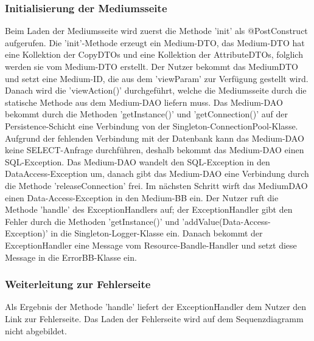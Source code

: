 \documentclass{article}
\begin{document}
\subsubsection{Initialisierung der Mediumsseite}
Beim Laden der Mediumsseite wird zuerst die Methode 'init' als @PostConstruct aufgerufen. Die 'init'-Methode erzeugt ein Medium-DTO, das Medium-DTO hat eine Kollektion der CopyDTOs und eine Kollektion der AttributeDTOs, folglich werden sie vom Medium-DTO erstellt. Der Nutzer bekommt das MediumDTO und setzt eine Medium-ID, die aus dem 'viewParam' zur Verfügung gestellt wird. Danach wird die 'viewAction()' durchgeführt, welche die Mediumsseite durch die statische Methode aus dem Medium-DAO liefern muss. Das Medium-DAO bekommt durch die Methoden 'getInstance()' und 'getConnection()' auf der Persistence-Schicht eine Verbindung von der Singleton-ConnectionPool-Klasse. Aufgrund der fehlenden Verbindung mit der Datenbank kann das Medium-DAO keine SELECT-Anfrage durchführen, deshalb bekommt das Medium-DAO einen SQL-Exception. Das Medium-DAO wandelt den SQL-Exception in den DataAccess-Exception um, danach gibt das Medium-DAO eine Verbindung durch die Methode 'releaseConnection' frei. Im nächsten Schritt wirft das MediumDAO einen Data-Access-Exception in den Medium-BB ein. Der Nutzer ruft die Methode 'handle' des ExceptionHandlers auf; der ExceptionHandler gibt den Fehler durch die Methoden 'getInstance()' und 'addValue(Data-Access-Exception)' in die Singleton-Logger-Klasse ein. Danach bekommt der ExceptionHandler eine Message vom Resource-Bandle-Handler und setzt diese Message in die ErrorBB-Klasse ein. 
\subsubsection{Weiterleitung zur Fehlerseite}
Als Ergebnis der Methode 'handle' liefert der ExceptionHandler dem Nutzer den Link zur Fehlerseite. Das Laden der Fehlerseite wird auf dem Sequenzdiagramm nicht abgebildet.

\newpage

\end{document}
